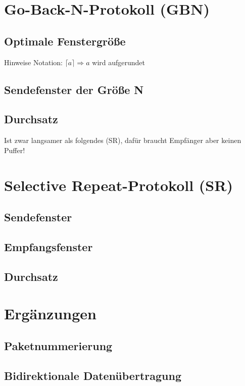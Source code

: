 \section{Go-Back-N-Protokoll (GBN)}
\subsection{Optimale Fenstergröße}
Hinweise Notation: $\lceil a \rceil \Rightarrow a$ wird aufgerundet 
\subsection{Sendefenster der Größe N}
\subsection{Durchsatz}
Ist zwar langsamer als folgendes (SR), dafür braucht Empfänger aber keinen Puffer!

\section{Selective Repeat-Protokoll (SR)}
\subsection{Sendefenster}
\subsection{Empfangsfenster}
\subsection{Durchsatz}

\section{Ergänzungen}
\subsection{Paketnummerierung}
\subsection{Bidirektionale Datenübertragung}
